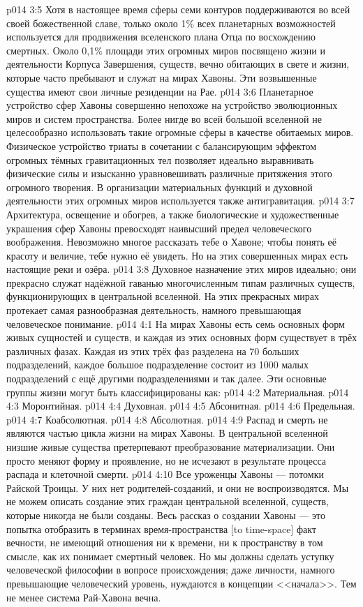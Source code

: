 \vs p014 3:5 Хотя в настоящее время сферы семи контуров поддерживаются во всей своей божественной славе, только около 1\% всех планетарных возможностей используется для продвижения вселенского плана Отца по восхождению смертных. Около 0,1\% площади этих огромных миров посвящено жизни и деятельности Корпуса Завершения, существ, вечно обитающих в свете и жизни, которые часто пребывают и служат на мирах Хавоны. Эти возвышенные существа имеют свои личные резиденции на Рае.
\vs p014 3:6 Планетарное устройство сфер Хавоны совершенно непохоже на устройство эволюционных миров и систем пространства. Более нигде во всей большой вселенной не целесообразно использовать такие огромные сферы в качестве обитаемых миров. Физическое устройство триаты в сочетании с балансирующим эффектом огромных тёмных гравитационных тел позволяет идеально выравнивать физические силы и изысканно уравновешивать различные притяжения этого огромного творения. В организации материальных функций и духовной деятельности этих огромных миров используется также антигравитация.
\vs p014 3:7 Архитектура, освещение и обогрев, а также биологические и художественные украшения сфер Хавоны превосходят наивысший предел человеческого воображения. Невозможно многое рассказать тебе о Хавоне; чтобы понять её красоту и величие, тебе нужно её увидеть. Но на этих совершенных мирах есть настоящие реки и озёра.
\vs p014 3:8 Духовное назначение этих миров идеально; они прекрасно служат надёжной гаванью многочисленным типам различных существ, функционирующих в центральной вселенной. На этих прекрасных мирах протекает самая разнообразная деятельность, намного превышающая человеческое понимание.
\vs p014 4:1 На мирах Хавоны есть семь основных форм живых сущностей и существ, и каждая из этих основных форм существует в трёх различных фазах. Каждая из этих трёх фаз разделена на 70 больших подразделений, каждое большое подразделение состоит из 1000 малых подразделений с ещё другими подразделениями и так далее. Эти основные группы жизни могут быть классифицированы как:
\vs p014 4:2 Материальная.
\vs p014 4:3 Моронтийная.
\vs p014 4:4 Духовная.
\vs p014 4:5 Абсонитная.
\vs p014 4:6 Предельная.
\vs p014 4:7 Коабсолютная.
\vs p014 4:8 Абсолютная.
\vs p014 4:9 \pc Распад и смерть не являются частью цикла жизни на мирах Хавоны. В центральной вселенной низшие живые существа претерпевают преобразование материализации. Они просто меняют форму и проявление, но не исчезают в результате процесса распада и клеточной смерти.
\vs p014 4:10 \pc Все уроженцы Хавоны --- потомки Райской Троицы. У них нет родителей\hyp{}созданий, и они не воспроизводятся. Мы не можем описать создание этих граждан центральной вселенной, существ, которые никогда не были созданы. Весь рассказ о создании Хавоны --- это попытка отобразить в терминах время\hyp{}пространства [to time\hyp{}space] факт вечности, не имеющий отношения ни к времени, ни к пространству в том смысле, как их понимает смертный человек. Но мы должны сделать уступку человеческой философии в вопросе происхождения; даже личности, намного превышающие человеческий уровень, нуждаются в концепции <<начала>>. Тем не менее система Рай\hyp{}Хавона вечна.
